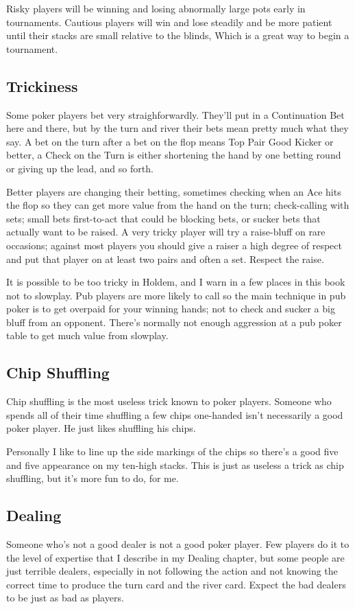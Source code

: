 Risky players will be winning and losing abnormally large pots
early in tournaments. Cautious players will win and lose steadily and
be more patient until their stacks are small relative to the blinds,
Which is a great way to begin a tournament.

\subsection{Trickiness}

Some poker players bet very straighforwardly. They'll put in a
Continuation Bet here and there, but by the turn and river their bets
mean pretty much what they say. A bet on the turn after a bet on the
flop means Top Pair Good Kicker or better, a Check on the Turn is
either shortening the hand by one betting round or giving up the lead,
and so forth.

Better players are changing their betting, sometimes checking when an
Ace hits the flop so they can get more value from the hand on the
turn; check-calling with sets; small bets first-to-act that could be
blocking bets, or sucker bets that actually want to be raised. A very
tricky player will try a raise-bluff on rare occasions; against most
players you should give a raiser a high degree of respect and put that
player on at least two pairs and often a set. Respect the raise.

It is possible to be too tricky in Holdem, and I warn in a few places
in this book not to slowplay. Pub players are more likely to call so
the main technique in pub poker is to get overpaid for your winning
hands; not to check and sucker a big bluff from an opponent. There's
normally not enough aggression at a pub poker table to get much
value from slowplay.

\subsection{Chip Shuffling}

Chip shuffling is the most useless trick known to poker players.
Someone who spends all of their time shuffling a few chips one-handed
isn't necessarily a good poker player. He just likes shuffling his
chips.

Personally I like to line up the side markings of the chips so there's
a good five and five appearance on my ten-high stacks. This is just as
useless a trick as chip shuffling, but it's more fun to do, for me.

\subsection{Dealing}

Someone who's not a good dealer is not a good poker player. Few
players do it to the level of expertise that I describe in my Dealing
chapter, but some people are just terrible dealers, especially in not
following the action and not knowing the correct time to produce the
turn card and the river card. Expect the bad dealers to be just as bad
as players.
